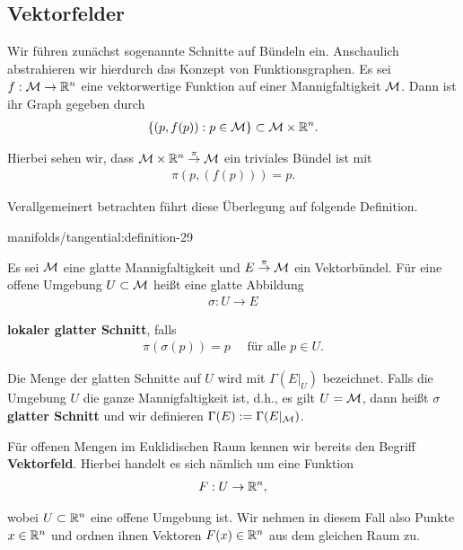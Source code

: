 \subsection{Vektorfelder}
\label{\detokenize{manifolds/tangential:vektorfelder}}
\par
Wir führen zunächst sogenannte Schnitte auf Bündeln ein.
Anschaulich abstrahieren wir hierdurch das Konzept von Funktionsgraphen.
Es sei \(f:\mathcal{M}\to\mathbb{R}^n\) eine vektorwertige Funktion auf einer Mannigfaltigkeit \(\mathcal{M}\).
Dann ist ihr Graph gegeben durch
\begin{align*}
\{(p,f(p)): p\in\mathcal{M}\}\subset \mathcal{M}\times\mathbb{R}^n.
\end{align*}
\par
Hierbei sehen wir, dass \(\mathcal{M}\times\mathbb{R}^n\overset{\pi}{\to}\mathcal{M}\) ein triviales Bündel ist mit
\begin{align*}
\pi(p,(f(p))) = p.
\end{align*}
\par
Verallgemeinert betrachten führt diese Überlegung auf folgende Definition.
\begin{definition}{}{manifolds/tangential:definition-29}



\par
Es sei \(\mathcal{M}\) eine glatte Mannigfaltigkeit und \(E\overset{\pi}{\to}\mathcal{M}\) ein Vektorbündel.
Für eine offene Umgebung \(U\subset\mathcal{M}\) heißt eine glatte Abbildung
\begin{align*}
\sigma: U\to E
\end{align*}
\par
\textbf{lokaler glatter Schnitt}, falls
\begin{align*}
\pi(\sigma(p)) = p\quad\text{ für alle }p\in U.
\end{align*}
\par
Die Menge der glatten Schnitte auf \(U\) wird mit \(\Gamma(E\rvert_U)\) bezeichnet.
Falls die Umgebung \(U\) die ganze Mannigfaltigkeit ist, d.h., es gilt \(U=\mathcal{M}\), dann heißt \(\sigma\) \textbf{glatter Schnitt} und wir definieren \(\Gamma(E):=\Gamma(E\rvert_{\mathcal{M}})\).
\end{definition}

\par
Für offenen Mengen im Euklidischen Raum kennen wir bereits den Begriff \textbf{Vektorfeld}.
Hierbei handelt es sich nämlich um eine Funktion
\begin{align*}
F:U\to\mathbb{R}^n,
\end{align*}
\par
wobei \(U\subset\mathbb{R}^n\) eine offene Umgebung ist.
Wir nehmen in diesem Fall also Punkte \(x\in\mathbb{R}^n\) und ordnen ihnen Vektoren \(F(x)\in\mathbb{R}^n\) aus dem gleichen Raum zu.


